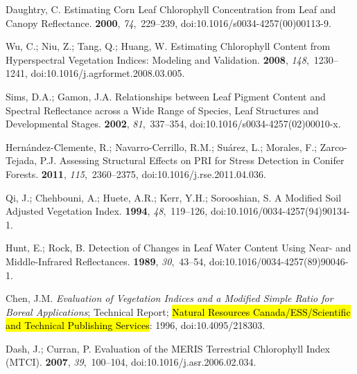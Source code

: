 \documentclass[remotesensing,article,accept,moreauthors,pdftex]{Definitions/mdpi}
\begin{document}
\begin{thebibliography}{999}
Daughtry, C.
\newblock Estimating {{Corn Leaf Chlorophyll Concentration}} from {{Leaf}} and
  {{Canopy Reflectance}}.
 {\bf 2000}, {\em 74},~229--239, doi:10.1016/s0034-4257(00)00113-9.

Wu, C.; Niu, Z.; Tang, Q.; Huang, W.
\newblock Estimating Chlorophyll Content from Hyperspectral Vegetation Indices:
  Modeling and Validation.
 {\bf 2008}, {\em
  148},~1230--1241, doi:10.1016/j.agrformet.2008.03.005.

Sims, D.A.; Gamon, J.A.
\newblock Relationships between Leaf Pigment Content and Spectral Reflectance
  across a Wide Range of Species, Leaf Structures and Developmental Stages.
 {\bf 2002}, {\em 81},~337--354, doi:10.1016/s0034-4257(02)00010-x.

{Hern{\'a}ndez-Clemente}, R.; {Navarro-Cerrillo}, R.M.; Su{\'a}rez, L.;
  Morales, F.; {Zarco-Tejada}, P.J.
\newblock Assessing Structural Effects on {{PRI}} for Stress Detection in
  Conifer Forests.
 {\bf 2011}, {\em
  115},~2360--2375, doi:10.1016/j.rse.2011.04.036.

Qi, J.; Chehbouni, A.; Huete, A.R.; Kerr, Y.H.; Sorooshian, S.
\newblock A Modified Soil Adjusted Vegetation Index.
 {\bf 1994}, {\em 48},~119--126, doi:10.1016/0034-4257(94)90134-1.

Hunt, E.; Rock, B.
\newblock Detection of Changes in Leaf Water Content Using {{Near}}- and
  {{Middle}}-{{Infrared}} Reflectances.
 {\bf 1989}, {\em 30},~43--54, doi:10.1016/0034-4257(89)90046-1.

Chen, J.M.
\newblock \emph{Evaluation of Vegetation Indices and a {{Modified Simple Ratio}} for
  Boreal Applications};
\newblock Technical Report; {\hl{Natural Resources Canada/ESS/Scientific and
  Technical Publishing Services}}:  1996, doi:10.4095/218303.

Dash, J.; Curran, P.
\newblock Evaluation of the {{MERIS}} Terrestrial Chlorophyll Index ({{MTCI}}).
 {\bf 2007}, {\em 39},~100--104, doi:10.1016/j.asr.2006.02.034.


\end{thebibliography}
\end{document}

